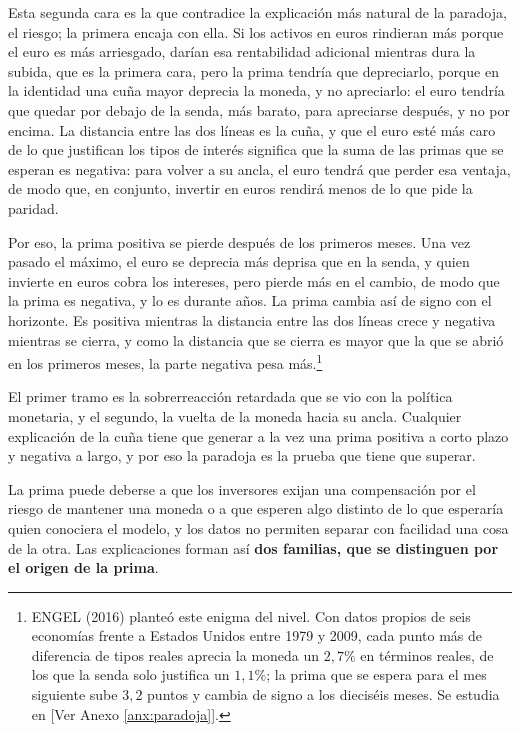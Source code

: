 \documentclass[10pt,a4paper]{article}
\newcommand{\authorfont}[1]{{\fontfamily{EBGaramond-TLF}\selectfont #1}}
\begin{document}
Esta segunda cara es la que contradice la explicación más natural de la paradoja, el riesgo; la primera encaja con ella. Si los activos en euros rindieran más porque el euro es más arriesgado, darían esa rentabilidad adicional mientras dura la subida, que es la primera cara, pero la prima tendría que depreciarlo, porque en la identidad una cuña mayor deprecia la moneda, y no apreciarlo: el euro tendría que quedar por debajo de la senda, más barato, para apreciarse después, y no por encima. La distancia entre las dos líneas es la cuña, y que el euro esté más caro de lo que justifican los tipos de interés significa que la suma de las primas que se esperan es negativa: para volver a su ancla, el euro tendrá que perder esa ventaja, de modo que, en conjunto, invertir en euros rendirá menos de lo que pide la paridad.

Por eso, la prima positiva se pierde después de los primeros meses. Una vez pasado el máximo, el euro se deprecia más deprisa que en la senda, y quien invierte en euros cobra los intereses, pero pierde más en el cambio, de modo que la prima es negativa, y lo es durante años. La prima cambia así de signo con el horizonte. Es positiva mientras la distancia entre las dos líneas crece y negativa mientras se cierra, y como la distancia que se cierra es mayor que la que se abrió en los primeros meses, la parte negativa pesa más.\footnote{%
    ENGEL (2016) planteó este enigma del nivel. Con datos propios de seis economías frente a Estados Unidos entre 1979 y 2009, cada punto más de diferencia de tipos reales aprecia la moneda un $2{,}7\%$ en términos reales, de los que la senda solo justifica un $1{,}1\%$; la prima que se espera para el mes siguiente sube $3{,}2$ puntos y cambia de signo a los dieciséis meses. Se estudia en [\authorfont{Ver Anexo \ref{anx:paradoja}}].
}

El primer tramo es la sobrerreacción retardada que se vio con la política monetaria, y el segundo, la vuelta de la moneda hacia su ancla. Cualquier explicación de la cuña tiene que generar a la vez una prima positiva a corto plazo y negativa a largo, y por eso la paradoja es la prueba que tiene que superar.

La prima puede deberse a que los inversores exijan una compensación por el riesgo de mantener una moneda o a que esperen algo distinto de lo que esperaría quien conociera el modelo, y los datos no permiten separar con facilidad una cosa de la otra. Las explicaciones forman así \textbf{dos familias, que se distinguen por el origen de la prima}. 
\end{document}

